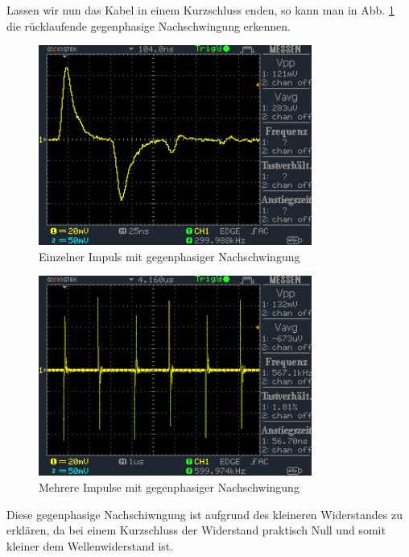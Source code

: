\documentclass[a4paper,12pt,twocoloumn]{article}
\numberwithin{equation}{section}
\begin{document}
Lassen wir nun das Kabel in einem Kurzschluss enden, so kann man in Abb. \ref{fig:3.6} die rücklaufende gegenphasige Nachschwingung erkennen.
\begin{figure}[h]
        \centering
        \includegraphics[width=0.8\textwidth]{data/DS0023.BMP.png}
        \caption{Einzelner Impuls mit gegenphasiger Nachschwingung}
		\label{fig:3.6}
\end{figure}
\begin{figure}[h]
        \centering
        \includegraphics[width=0.8\textwidth]{data/DS0022.BMP.png}
        \caption{Mehrere Impulse mit gegenphasiger Nachschwingung}
		\label{fig:3.7}
\end{figure}
Diese gegenphasige Nachschiwngung ist aufgrund des kleineren Widerstandes zu erklären, da bei einem Kurzschluss der Widerstand praktisch Null und somit kleiner dem Wellenwiderstand ist. 




\clearpage
\listoffigures
\listoftables



\end{document}
